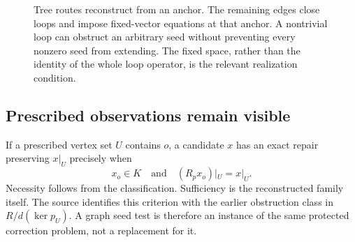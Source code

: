 \begin{figure}[htbp]\centering{}\caption{Tree routes reconstruct from an anchor. The remaining edges close loops and impose fixed-vector equations at that anchor. A nontrivial loop can obstruct an arbitrary seed without preventing every nonzero seed from extending. The fixed space, rather than the identity of the whole loop operator, is the relevant realization condition.}\label{KS:fig:holonomy}\end{figure}

\subsection{Prescribed observations remain visible}
If a prescribed vertex set \(U\) contains \(o\), a candidate \(x\) has an exact repair preserving \(x|_U\) precisely when
\[
 x_o\in K\quad\text{and}\quad (R_px_o)|_U=x|_U.
\]
Necessity follows from the classification. Sufficiency is the reconstructed family itself. The source identifies this criterion with the earlier obstruction class in \(R/d(\ker p_U)\). A graph seed test is therefore an instance of the same protected correction problem, not a replacement for it.

